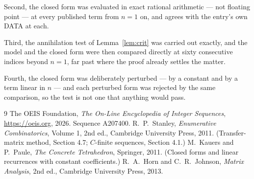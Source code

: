 \documentclass[11pt,a4paper]{article}
\theoremstyle{plain}
\theoremstyle{definition}
\begin{document}
Second, the closed form was evaluated in exact rational arithmetic --- not floating point ---
at every published term from $n=1$ on, and agrees with the entry's own DATA at each.

Third, the annihilation test of Lemma~\ref{lem:crit} was carried out exactly, and the model
and the closed form were then compared directly at sixty consecutive indices beyond
$n=1$, far past where the proof already settles the matter.

Fourth, the closed form was deliberately perturbed --- by a constant and by a term linear in
$n$ --- and each perturbed form was rejected by the same comparison, so the test is not one
that anything would pass.

\begin{thebibliography}{9}
 The OEIS Foundation, \emph{The On-Line Encyclopedia of Integer
Sequences}, \url{https://oeis.org}, 2026. Sequence A207400.
 R.~P.~Stanley, \emph{Enumerative Combinatorics}, Volume 1, 2nd ed.,
Cambridge University Press, 2011. (Transfer-matrix method, Section 4.7; $C$-finite sequences,
Section 4.1.)
 M.~Kauers and P.~Paule, \emph{The Concrete Tetrahedron}, Springer, 2011.
(Closed forms and linear recurrences with constant coefficients.)
 R.~A.~Horn and C.~R.~Johnson, \emph{Matrix Analysis}, 2nd ed., Cambridge
University Press, 2013.
\end{thebibliography}
\end{document}
